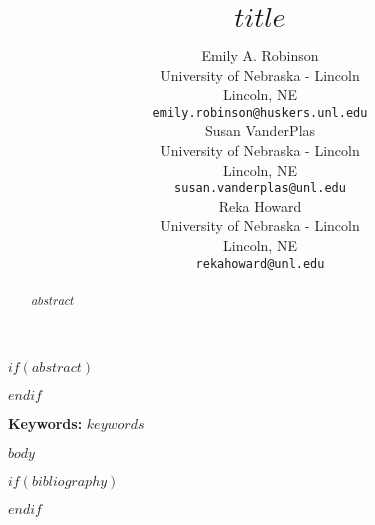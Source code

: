 \documentclass[10pt]{article}
\title{$title$}
\author{
  Emily A. Robinson \\
  \small{University of Nebraska - Lincoln}\\
  \small{Lincoln, NE} \\
  \small{\tt emily.robinson@huskers.unl.edu} \\\And
 Susan VanderPlas \\
  \small{University of Nebraska - Lincoln}\\
  \small{Lincoln, NE} \\
  \small{\tt susan.vanderplas@unl.edu} \\\And
  Reka Howard \\
  \small{University of Nebraska - Lincoln}\\
  \small{Lincoln, NE} \\
  \small{\tt rekahoward@unl.edu} \\}
\date{}
\begin{document}
\maketitle
$if(abstract)$
\begin{abstract}
$abstract$
\end{abstract}
$endif$

{\bf Keywords:} $keywords$

$body$


$if(bibliography)$

$endif$
% 
\end{document}
